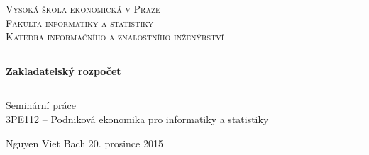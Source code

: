\begin{titlepage}
\begin{center}

\textsc{\LARGE Vysoká škola ekonomická v Praze}\\[0.5cm]
\textsc{\large Fakulta informatiky a statistiky}\\[0.5cm]
\textsc{\large Katedra informačního a znalostního inženýrství}\\[0.5cm]

\vfill

\hrule
\vspace{0.6cm}
\huge {\bfseries Zakladatelský rozpočet}
\vspace{0.4cm}
\hrule
\vspace{0.4cm}
\large 
Seminární práce \\ 3PE112 -- Podniková ekonomika pro informatiky a statistiky \\

\vfill

\large Nguyen Viet Bach \hfill 20. prosince 2015

\end{center}
\end{titlepage}

